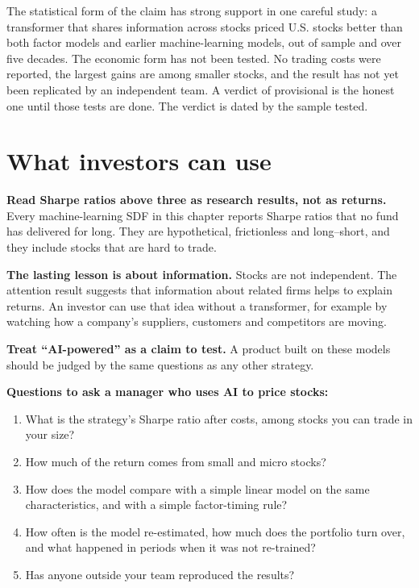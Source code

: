 The statistical form of the claim has strong support in one careful study: a transformer that shares information across stocks priced U.S. stocks better than both factor models and earlier machine-learning models, out of sample and over five decades. The economic form has not been tested. No trading costs were reported, the largest gains are among smaller stocks, and the result has not yet been replicated by an independent team. A verdict of provisional is the honest one until those tests are done. The verdict is dated by the sample tested.

\section{What investors can use}
\label{sec:20-investors}

\textbf{Read Sharpe ratios above three as research results, not as returns.} Every machine-learning SDF in this chapter reports Sharpe ratios that no fund has delivered for long. They are hypothetical, frictionless and long--short, and they include stocks that are hard to trade.

\textbf{The lasting lesson is about information.} Stocks are not independent. The attention result suggests that information about related firms helps to explain returns. An investor can use that idea without a transformer, for example by watching how a company's suppliers, customers and competitors are moving.

\textbf{Treat ``AI-powered'' as a claim to test.} A product built on these models should be judged by the same questions as any other strategy.

\textbf{Questions to ask a manager who uses AI to price stocks:}

\begin{enumerate}
  \item What is the strategy's Sharpe ratio after costs, among stocks you can trade in your size?
  \item How much of the return comes from small and micro stocks?
  \item How does the model compare with a simple linear model on the same characteristics, and with a simple factor-timing rule?
  \item How often is the model re-estimated, how much does the portfolio turn over, and what happened in periods when it was not re-trained?
  \item Has anyone outside your team reproduced the results?
\end{enumerate}

